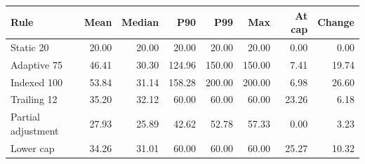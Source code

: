 \begin{tabular}{lrrrrrrr}
\toprule
Rule & Mean & Median & P90 & P99 & Max & At cap & Change \\
\midrule
Static 20 & 20.00 & 20.00 & 20.00 & 20.00 & 20.00 & 0.00 & 0.00 \\
Adaptive 75 & 46.41 & 30.30 & 124.96 & 150.00 & 150.00 & 7.41 & 19.74 \\
Indexed 100 & 53.84 & 31.14 & 158.28 & 200.00 & 200.00 & 6.98 & 26.60 \\
Trailing 12 & 35.20 & 32.12 & 60.00 & 60.00 & 60.00 & 23.26 & 6.18 \\
Partial adjustment & 27.93 & 25.89 & 42.62 & 52.78 & 57.33 & 0.00 & 3.23 \\
Lower cap & 34.26 & 31.01 & 60.00 & 60.00 & 60.00 & 25.27 & 10.32 \\
\bottomrule
\end{tabular}
